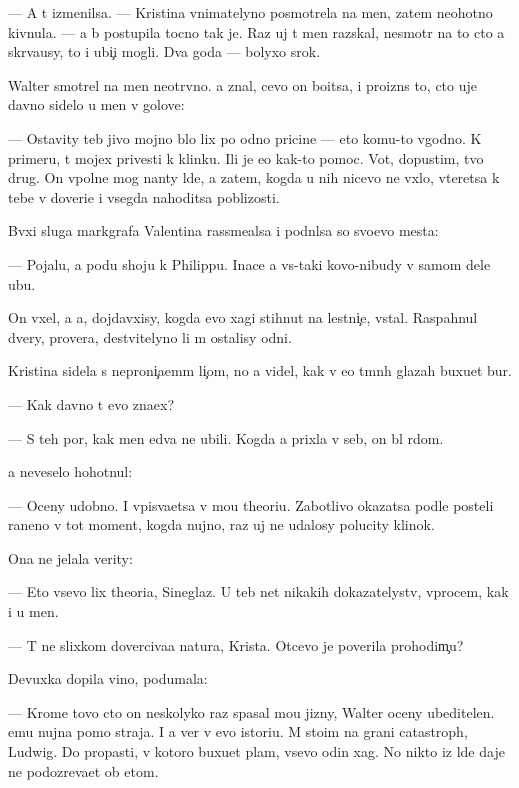\documentclass[10pt]{book}
\begin{document}
— A t{\yi} izmenilsa. — Kristina vnimatelyno posmotrela na men{\ia}, zatem neohotno kivnula. — {\Y}a b{\yi} postupila tocno tak je. Raz uj t{\yi} men{\ia} raz{\yi}skal, nesmotr{\ia} na to cto {\y}a skr{\yi}va{\y}usy, to i ubi{\y}{\c}i mogli. Dva goda — bolyxo{\y} srok.

Walter smotrel na men{\ia} neotr{\yi}vno. {\Y}a znal, cevo on bo{\y}itsa, i proizn{\e}s to, cto uje davno sidelo u men{\ia} v golove:

— Ostavity teb{\ia} jivo{\y} mojno b{\yi}lo lix po odno{\y} pricine — eto komu-to v{\yi}godno. K primeru, t{\yi} mojex privesti k klinku. Ili je {\y}e{\x}o kak-to pomoc. Vot, dopustim, tvo{\y} drug. On vpolne mog nan{\ia}ty l{\io}de{\y}, a zatem, kogda u nih nicevo ne v{\yi}xlo, vteretsa k tebe v doveri{\y}e i vsegda nahoditsa poblizosti.

B{\yi}vxi{\y} sluga markgrafa Valentina rassme{\y}alsa i podn{\ia}lsa so svo{\y}evo mesta:

— Pojalu{\y}, {\y}a po{\y}du shoju k Philippu. Inace {\y}a vs{\e}-taki kovo-nibudy v samom dele ub{\y}u.

On v{\yi}xel, a {\y}a, dojdavxisy, kogda {\y}evo xagi stihnut na lestni{\c}e, vstal. Raspahnul dvery, prover{\ia}{\y}a, de{\y}stvitelyno li m{\yi} ostalisy odni.

Kristina sidela s neproni{\c}a{\y}em{\yi}m li{\c}om, no {\y}a videl, kak v {\y}e{\y}o t{\e}mn{\yi}h glazah buxu{\y}et bur{\ia}.

— Kak davno t{\yi} {\y}evo zna{\y}ex?

— S teh por, kak men{\ia} {\y}edva ne ubili. Kogda {\y}a prixla v seb{\ia}, on b{\yi}l r{\ia}dom.

{\Y}a neveselo hohotnul:

— Oceny udobno. I vpis{\yi}va{\y}etsa v mo{\y}u theori{\y}u. Zabotlivo okazatsa podle posteli raneno{\y} v tot moment, kogda nujno, raz uj ne udalosy polucity klinok.

Ona ne jelala verity:

— Eto vsevo lix theori{\y}a, Sineglaz{\yi}{\y}. U teb{\ia} net nikakih dokazatelystv, vprocem, kak i u men{\ia}.

— T{\yi} ne slixkom doverciva{\y}a natura, Krista. Otcevo je poverila prohodim{\c}u?

Devuxka dopila vino, podumala:

— Krome tovo cto on neskolyko raz spasal mo{\y}u jizny, Walter oceny ubeditelen. {\Y}emu nujna pomo{\x} straja. I {\y}a ver{\io} v {\y}evo istori{\y}u. M{\yi} sto{\y}im na grani catastroph{\yi}, Ludwig. Do propasti, v kotoro{\y} buxu{\y}et plam{\ia}, vsevo odin xag. No nikto iz l{\io}de{\y} daje ne podozreva{\y}et ob etom.
\end{document}
